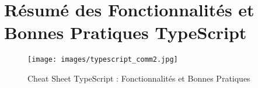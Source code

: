\documentclass[a4paper,12pt]{article}
\begin{document}
\section{Résumé des Fonctionnalités et Bonnes Pratiques TypeScript}
\noindent
\begin{figure}[h!]
    \centering
    \texttt{[image: images/typescript\_comm2.jpg]}
    \caption{Cheat Sheet TypeScript : Fonctionnalités et Bonnes Pratiques}
    \label{fig:Typescipt_Cheat_Sheet}
\end{figure}
\end{document}
